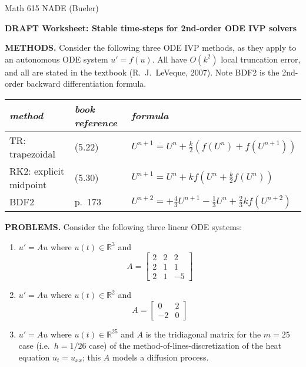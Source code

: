 \documentclass[11pt]{amsart}
\newcommand{\RR}{\mathbb{R}}
\begin{document}
\scriptsize \noindent Math 615 NADE (Bueler) \hfill \quad {}
\normalsize

\bigskip

\Large\centerline{\textbf{DRAFT Worksheet:  Stable time-steps for 2nd-order ODE IVP solvers}}
\medskip
\normalsize

\thispagestyle{empty}

\bigskip\bigskip
\noindent \textbf{METHODS.}  Consider the following three ODE IVP methods, as they apply to an autonomous ODE system $u'=f(u)$.  All have $O(k^2)$ local truncation error, and all are stated in the textbook (R.~J.~LeVeque, 2007).  Note BDF2 is the 2nd-order backward differentiation formula.

\bigskip
\renewcommand{\arraystretch}{1.4}
\begin{tabular}{lll}
\emph{method}\phantom{sdfaadsfasdfasdxxx} & \emph{book reference}\phantom{xx} & \emph{formula} \\ \hline
TR: trapezoidal         & (5.22) & $U^{n+1} = U^n + \frac{k}{2} \left(f(U^n) + f(U^{n+1})\right)$ \\
RK2: explicit midpoint  & (5.30) & $U^{n+1} = U^n + k f\left(U^n + \frac{k}{2} f(U^n)\right)$ \\
BDF2                    & p.~173 & $U^{n+2} = + \frac{4}{3} U^{n+1} - \frac{1}{3} U^n + \frac{2}{3} k f\left(U^{n+2}\right)$
\end{tabular}


\bigskip
\noindent \textbf{PROBLEMS.}  Consider the following three linear ODE systems:
\renewcommand{\labelenumi}{S\arabic{enumi}.\,}
\begin{enumerate}
\item $u' = A u$ where $u(t)\in\RR^3$ and
    $$A = \begin{bmatrix}
    2 & 2 & 2 \\
    2 & 1 & 1 \\
    2 & 1 & -5
    \end{bmatrix}$$
\item $u' = A u$ where $u(t)\in\RR^2$ and
    $$A = \begin{bmatrix}
    0 & 2 \\
    -2 & 0
    \end{bmatrix}$$
\item $u' = A u$ where $u(t)\in\RR^{25}$ and $A$ is the tridiagonal matrix for the $m=25$ case (i.e.~$h=1/26$ case) of the method-of-lines-discretization of the heat equation $u_t = u_{xx}$; this $A$ models a diffusion process.
\end{enumerate}
\end{document}
